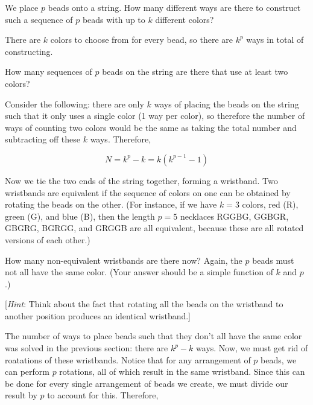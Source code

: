 \documentclass[11pt]{article}
\begin{document}
\begin{Parts}
    \Part
    We place $p$ beads onto a string.
    How many different ways are there to construct such a sequence of $p$ beads with up to $k$ different colors?

    \begin{solution}
      There are $k$ colors to choose from for every bead, so there are $k^p$ ways in total of constructing.
    \end{solution}

    \Part How many sequences of $p$ beads on the string are there that use at least two colors?

    \begin{solution}
      Consider the following: there are only $k$ ways of placing the beads on the string such that it only uses a single color (1 way per color), so therefore the number of ways of counting two colors would be the same as taking the total number and subtracting off these $k$ ways. Therefore, 

      \[ N = k^p - k = k(k^{p-1} - 1)\]
    \end{solution}

    \Part
    Now we tie the two ends of the string together, forming a
    wristband.
    Two wristbands are equivalent if the sequence of colors on one
    can be obtained by rotating the beads on the other.
    (For instance, if we have $k=3$ colors, red (R), green (G), and
    blue (B), then the length $p = 5$ necklaces RGGBG, GGBGR, GBGRG, BGRGG, and GRGGB are all
    equivalent, because these are all rotated versions of each other.)

    How many non-equivalent wristbands are there now?
    Again, the $p$
    beads must not all have the same color.
    (Your answer should be a simple function of $k$ and $p$.)

    [\textit{Hint}: Think about the fact that rotating all the beads on the wristband to another
        position produces an identical wristband.]


      \begin{solution}
        The number of ways to place beads such that they don't all have the same color was solved in the previous section: there are $k^p - k$ ways. Now, we must get rid of roatations of these wristbands. Notice that for any arrangement of $p$ beads, we can perform $p$ rotations, all of which result in the same wristband. Since this can be done for every single arrangement of beads we create, we must divide our result by $p$ to account for this. Therefore, 


\end{solution}
\end{Parts}
\end{document}
